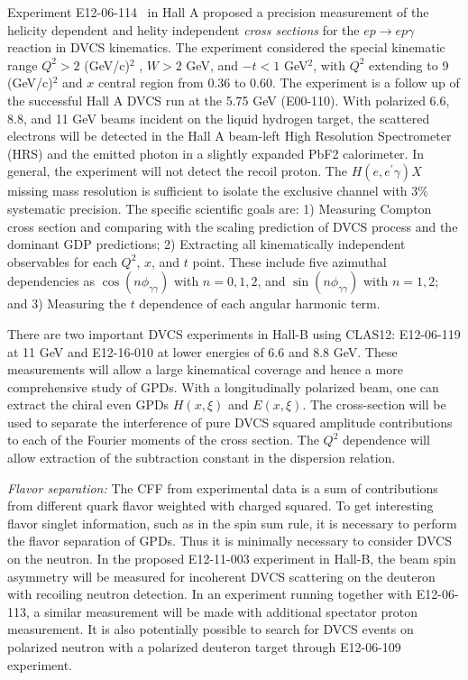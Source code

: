Experiment E12-06-114~\cite{Hyde2019} in Hall A proposed a precision measurement of the helicity dependent and helity independent {\it cross sections} for the $ep \rightarrow ep\gamma$ reaction in DVCS kinematics. The experiment considered the special kinematic range $Q^2> 2$ (GeV/c)$^2$ , $W > 2$ GeV, and $-t < 1$ GeV$^2$, with $Q^2$ extending to 9 (GeV/c)$^2$ and $x$ central region from 0.36 to 0.60.  The experiment is a follow up of the successful Hall
A DVCS run at the 5.75 GeV (E00-110). With polarized 6.6, 8.8, and 11 GeV beams incident on the liquid hydrogen target, the scattered electrons will be detected in the Hall A beam-left High Resolution Spectrometer (HRS)  %
and the emitted photon in a slightly expanded PbF2 calorimeter. In general, the experiment will not detect the recoil proton. The $H(e, e^\prime\gamma )X$ missing mass resolution is sufficient to isolate the exclusive channel with 3\% systematic precision. The specific scientific goals are: 1) Measuring Compton cross section and comparing
with the scaling prediction of DVCS process and the dominant GDP predictions; 2) Extracting all kinematically independent observables for each $Q^2$, $x$, and $t$ point. These include five azimuthal dependencies as
$\cos(n\phi_{\gamma\gamma})$ with $n=0,1,2$, and
$\sin(n\phi_{\gamma\gamma})$ with $n=1,2$; and 3) Measuring the $t$ dependence of each angular harmonic term. 

There are two important DVCS experiments in Hall-B using CLAS12: E12-06-119\cite{E12-06-119} at 11 GeV and E12-16-010\cite{E12-16-010B} at lower energies of 6.6 and 8.8 GeV. 
These measurements will allow a large kinematical coverage and hence a more comprehensive study of GPDs. With a longitudinally polarized beam, one can extract the chiral even GPDs $H(x,\xi)$ and $E(x,\xi)$. The cross-section will be used to separate the interference of pure DVCS squared amplitude contributions to each of the Fourier moments of the cross section. The $Q^2$ dependence will allow extraction of the subtraction constant in the dispersion relation. %

{\it Flavor separation:} The CFF from experimental data is a sum of contributions 
from different quark flavor weighted with charged squared. To get interesting flavor singlet information, such as in the spin sum rule, it is necessary to perform the flavor separation of GPDs. Thus it is minimally necessary to consider DVCS on the neutron. In the proposed E12-11-003\cite{E12-11-003} experiment in Hall-B, the beam spin asymmetry will be measured for incoherent DVCS scattering on the deuteron with recoiling neutron detection. In an experiment running together with E12-06-113, a similar measurement will be made with additional spectator proton measurement. It is also potentially possible to search for DVCS events on polarized neutron with a polarized deuteron target through E12-06-109 experiment. 


